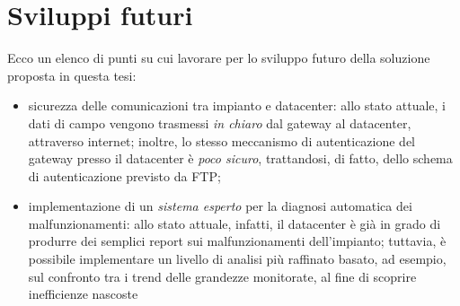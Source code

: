 \clearpage{\pagestyle{empty}\cleardoublepage}
\chapter{Sviluppi futuri}
Ecco un elenco di punti su cui lavorare per lo sviluppo futuro della soluzione proposta
in questa tesi:
%
\begin{itemize}
\item sicurezza delle comunicazioni tra impianto e datacenter:
      allo stato attuale, i dati di campo vengono trasmessi \emph{in chiaro} dal gateway al datacenter, 
      attraverso internet; inoltre, lo stesso meccanismo di autenticazione del gateway presso il datacenter 
      \`e \emph{poco sicuro}, trattandosi, di fatto, dello schema di autenticazione previsto da FTP;
%      
\item implementazione di un \emph{sistema esperto} per la diagnosi automatica dei malfunzionamenti:
      allo stato attuale, infatti, il datacenter \`e gi\`a in grado di produrre dei semplici report
      sui malfunzionamenti dell'impianto; tuttavia, \`e possibile implementare un livello di analisi
      pi\`u raffinato basato, ad esempio, sul confronto tra i trend delle grandezze monitorate,
      al fine di scoprire inefficienze nascoste
\end{itemize}
